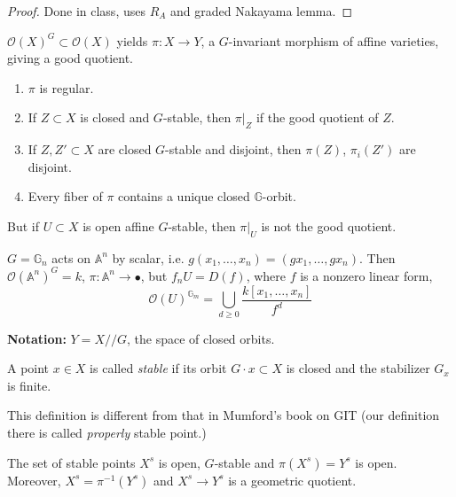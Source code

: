 \begin{proof}
Done in class, uses $R_A$ and graded Nakayama lemma.
\end{proof}

\medskip\noindent	
$\mathcal{O}(X)^G \subset \mathcal{O}(X)$ yields $\pi:X\to Y$, a $G$-invariant
morphism of affine varieties, giving a good quotient.

\begin{proposition}
\label{proposition-projection}
\begin{enumerate}
\item $\pi$ is regular.
\item If  $Z \subset X$ is closed and $G$-stable, then $\pi|_{Z}$ if the good
quotient of $Z$.
\item If $Z,Z'\subset X$ are closed $G$-stable and disjoint, then $\pi(Z)$,
$\pi_i(Z')$ are disjoint.
\item Every fiber of $\pi$ contains a unique closed $\mathbb{G}$-orbit.
\end{enumerate}
But if $U\subset X$ is open affine $G$-stable, then $\pi|_{U}$ is not the good
quotient.
\end{proposition}

\begin{example}
\label{example-Hopf-surface?}
$G=\mathbb{G}_n$ acts on $\mathbb{A}^n$ by scalar, i.e. 
$g(x_1,\ldots,x_n)=(gx_1,\ldots,gx_n)$. Then $\mathcal{O}(\mathbb{A}^n)^G=k$,
$\pi:\mathbb{A}^n \to \bullet$,
but $f_nU=D(f)$, where $f$ is a nonzero linear form,
$$
\mathcal{O}(U)^{\mathbb{G}_m}=\bigcup_{d \geq 0}\frac{k[x_1,\ldots,x_n]}{f^d}
$$
\end{example}

{\bf Notation:} $Y=X/\!/G$, the space of closed orbits.

\begin{definition}
\label{definition-stable-point}
A point $x \in X$ is called {\it stable} if its orbit $G\cdot x \subset X$ is
closed and the stabilizer  $G_x$ is finite.
\end{definition}

This definition is different from that in Mumford's book on GIT (our definition
there is called {\it properly} stable point.)

\begin{proposition}
\label{proposition-stable-points}
The set of stable points $X^s$ is open, $G$-stable and $\pi(X^s)=Y^s$ is open.
Moreover, $X^s=\pi^{-1}(Y^s)$ and $X^s \to Y^s$ is a geometric quotient.
\end{proposition}

